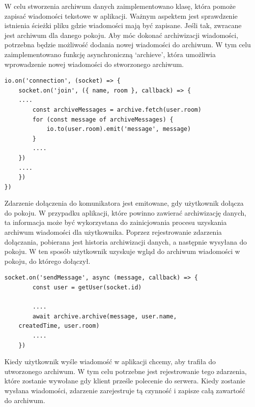 W celu stworzenia archiwum danych zaimplementowano klasę, która pomoże zapisać wiadomości tekstowe w aplikacji. Ważnym aspektem jest sprawdzenie istnienia ścieżki pliku gdzie wiadomości mają być zapisane. Jeśli tak, zwracane jest archiwum dla danego pokoju. Aby móc dokonać archiwizacji wiadomości, potrzebna będzie możliwość dodania nowej wiadomości do archiwum. W tym celu zaimplementowano funkcję asynchroniczną ‘archieve’, która umożliwia wprowadzenie nowej wiadomości do stworzonego archiwum. 
\begin{lstlisting}[caption={Wykorzystanie zdarzenia dołączenia, aby uzyskać widok zawartości archiwum w aplikacji}]
io.on('connection', (socket) => {
    socket.on('join', ({ name, room }, callback) => {
	....
        const archiveMessages = archive.fetch(user.room)
        for (const message of archiveMessages) {
            io.to(user.room).emit('message', message)
        }
        ....
    })
   	....
    })
})
\end{lstlisting}
Zdarzenie dołączenia do komunikatora jest emitowane, gdy użytkownik dołącza do pokoju. W przypadku aplikacji, które powinno zawierać archiwizację danych, ta informacja może być wykorzystana do zainicjowania procesu uzyskania archiwum wiadomości dla użytkownika. Poprzez rejestrowanie zdarzenia dołączania, pobierana jest historia archiwizacji danych, a następnie wysyłana do pokoju. W ten sposób użytkownik uzyskuje wgląd do archiwum wiadomości w pokoju, do którego dołączył.
\begin{lstlisting}[caption=Wykorzystanie zdarzenia wysyłania wiadomości do tworzenia archiwum]
socket.on('sendMessage', async (message, callback) => {
        const user = getUser(socket.id)

      	....
        await archive.archive(message, user.name, 
	createdTime, user.room)
       	....
    })
\end{lstlisting}

Kiedy użytkownik wyśle wiadomość w aplikacji chcemy, aby trafiła do utworzonego archiwum. W tym celu potrzebne jest rejestrowanie tego zdarzenia, które zostanie wywołane gdy klient prześle polecenie do serwera. Kiedy zostanie wysłana wiadomości, zdarzenie zarejestruje tą czynność i zapisze całą zawartość do archiwum. 




